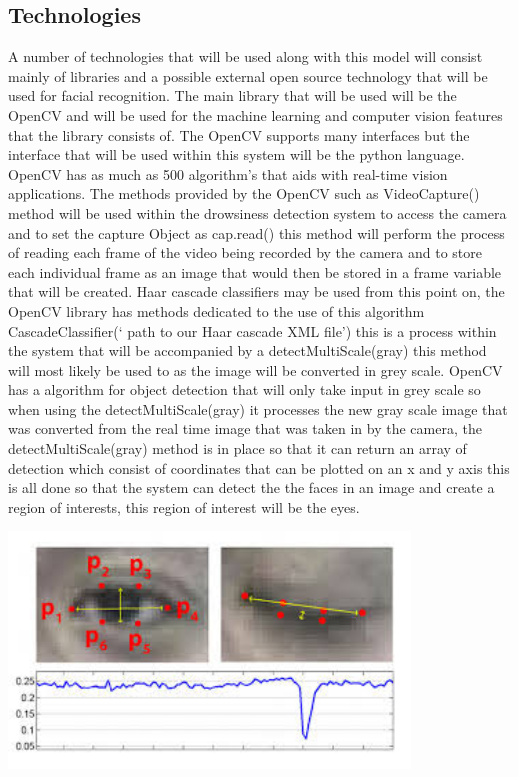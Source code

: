 \subsection{Technologies}
A number of technologies that will be used along with this model will consist mainly of libraries and a possible external open source  technology that will be used for facial recognition. The main library that will be used will be the OpenCV and will be used for the machine learning and computer vision features that the library consists of. 
The OpenCV supports many interfaces but the interface that will be used within this system will be the python language. OpenCV has as much as 500 algorithm's that aids with real-time vision applications. The methods provided by the OpenCV such as VideoCapture() method will be used within the drowsiness detection system to access the camera and to set the capture Object as cap.read() this method will perform the process of reading each frame of the video being recorded by the camera and to store each individual frame as an image that would then be stored in a frame variable that will be created. Haar cascade classifiers may be used from this point on, the OpenCV library has methods dedicated to the use of this algorithm CascadeClassifier(‘ path to our Haar cascade XML file’) this is a process within the system that will be accompanied by a detectMultiScale(gray) this method will most likely be used to as the image will be converted in grey scale. OpenCV has a algorithm for object detection that will only take input in grey scale so when using the detectMultiScale(gray) it processes the new gray scale image that was converted from the real time image that was taken in by the camera, the detectMultiScale(gray) method is in place so that it can return an array of detection which consist of coordinates that can be plotted on an x and y axis this is all done so that the system can detect the the faces in an image and create a region of interests, this region of interest will be the eyes. 

\includegraphics[width=0.8\textwidth]{Figures/eyeDetection.jpg}

